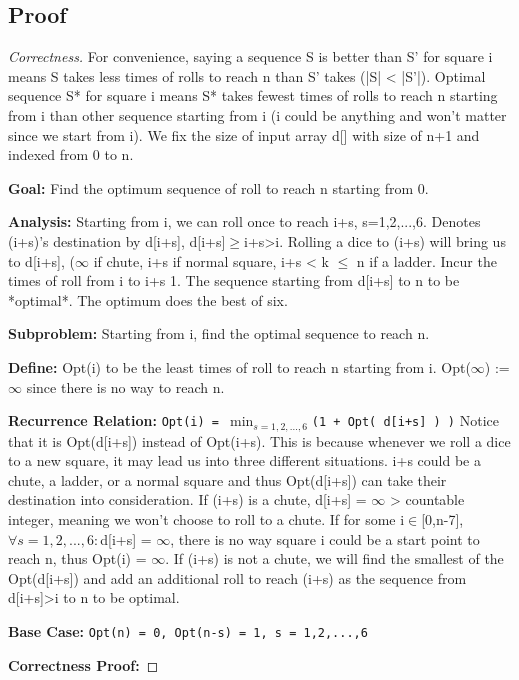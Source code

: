\documentclass[openany]{article}
\begin{document}
\subsection*{Proof}
\begin{proof}[Correctness]{}
    For convenience, saying a sequence S is better than S' for square i means S takes less times of rolls to reach n than S' takes (|S| < |S'|). Optimal sequence S* for square i means S* takes fewest times of rolls to reach n starting from i than other sequence starting from i (i could be anything and won't matter since we start from i). We fix the size of input array d[] with size of n+1 and indexed from 0 to n.
    
\textbf{Goal:} Find the optimum sequence of roll to reach n starting from 0.

\textbf{Analysis:} Starting from i, we can roll once to reach i+s, s=1,2,...,6. Denotes (i+s)'s destination by d[i+s], d[i+s]$\geq$i+s>i. Rolling a dice to (i+s) will bring us to d[i+s], ($\infty$ if chute, i+s if normal square, i+s < k $\leq$ n if a ladder. Incur the times of roll from i to i+s 1. The sequence starting from d[i+s] to n to be *optimal*. The optimum does the best of six.
    
\textbf{Subproblem:}
    Starting from i, find the optimal sequence to reach n.
    
\textbf{Define:} Opt(i) to be the least times of roll to reach n starting from i. Opt($\infty$) := $\infty$ since there is no way to reach n.
    
\textbf{Recurrence Relation:}
    \texttt{Opt(i) = $\min_{s=1,2,...,6}$(1 + Opt( d[i+s] ) )}
    Notice that it is Opt(d[i+s]) instead of Opt(i+s). This is because whenever we roll a dice to a new square, it may lead us into three different situations. i+s could be a chute, a ladder, or a normal square and thus Opt(d[i+s]) can take their destination into consideration. If (i+s) is a chute, d[i+s] = $\infty$ > countable integer, meaning we won't choose to roll to a chute. If for some i$\in$[0,n-7], $\forall s = 1,2,...,6: $d[i+s] = $\infty$, there is no way square i could be a start point to reach n, thus Opt(i) = $\infty$. If (i+s) is not a chute, we will find the smallest of the Opt(d[i+s]) and add an additional roll to reach (i+s) as the sequence from d[i+s]>i to n to be optimal.
    
\textbf{Base Case:}
    \texttt{Opt(n) = 0, Opt(n-s) = 1, s = 1,2,...,6}
    
\textbf{Correctness Proof:}


\end{proof}
\end{document}
